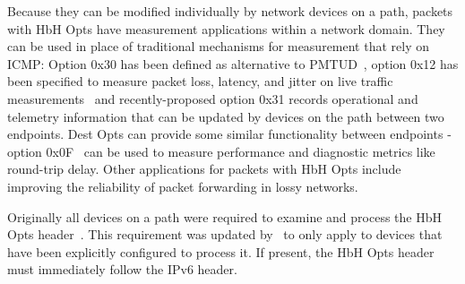\documentclass[conference]{IEEEtran}
\begin{document}







Because they can be modified individually by network devices on a path, packets
with HbH Opts have measurement applications within a network domain. They can
be used in place of traditional mechanisms for measurement that rely on ICMP:
Option 0x30 has been defined as alternative to PMTUD~\cite{rfc9268}, option
0x12 has been specified to measure packet loss, latency, and jitter on live
traffic measurements~\cite{rfc9343} and recently-proposed option 0x31 records
operational and telemetry information that can be updated by devices on the
path between two endpoints. Dest Opts can provide some similar functionality
between endpoints - option 0x0F~\cite{rfc8250} can be used to measure
performance and diagnostic metrics like round-trip delay.  Other applications
for packets with HbH Opts include improving the reliability of packet
forwarding in lossy networks.

Originally all devices on a path were required to examine and process the HbH
Opts header~\cite{rfc2460}. This requirement was updated by~\cite{RFC8200} to
only apply to devices that have been explicitly configured to process it. If
present, the HbH Opts header must immediately follow the IPv6 header. 
\end{document}
